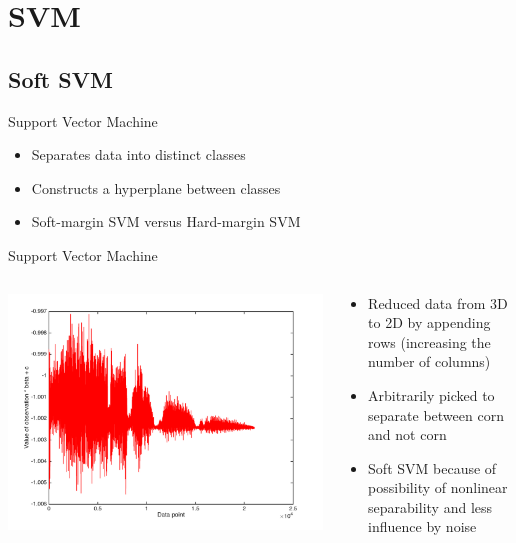 \documentclass[11pt]{beamer}
\begin{document}

\section{SVM}
\subsection{Soft SVM}
\begin{frame}{Support Vector Machine}
\begin{itemize}
\item Separates data into distinct classes
\item Constructs a hyperplane between classes
\item Soft-margin SVM versus Hard-margin SVM
\end{itemize}
\end{frame}

\begin{frame}{Support Vector Machine}
\begin{columns}[T]
\begin{column}{.48\textwidth}
\includegraphics[scale=.3]{softsvmImage.png}
\end{column}
\hfill
\begin{column}{.48\textwidth}
\begin{itemize}
\item Reduced data from 3D to 2D by appending rows (increasing the number of columns)
\item Arbitrarily picked to separate between corn and not corn
\item Soft SVM because of possibility of nonlinear separability and less influence by noise
\end{itemize}
\end{column}
\end{columns}
\end{frame}
\end{document}

